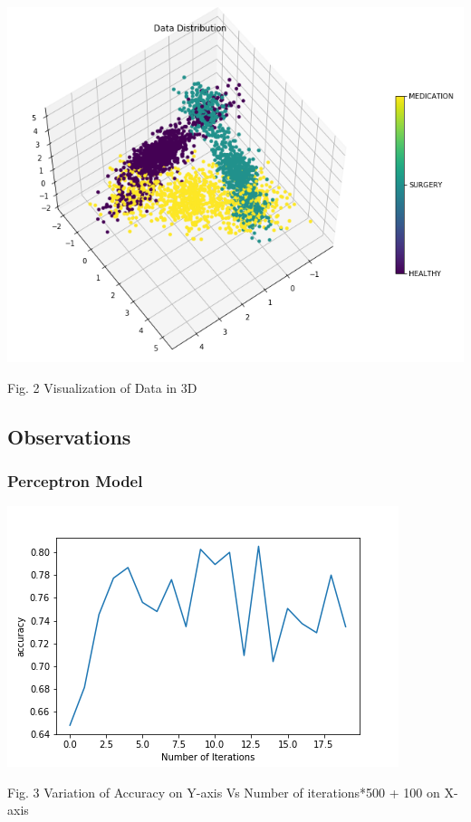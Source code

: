 \documentclass[12pt,journal,compsoc]{IEEEtran}
\begin{document}
\begin{center}
\includegraphics[scale=0.35]{3d_medical.png}

{\small Fig. 2 Visualization of Data in 3D}
\end{center}

\subsection{Observations}
\subsubsection{Perceptron Model}
\begin{center}
\includegraphics[scale=0.35]{perceptron_accuracy.png}

{\small Fig. 3 Variation of Accuracy on Y-axis Vs Number of iterations*500 + 100 on X-axis}
\end{center}
\end{document}
